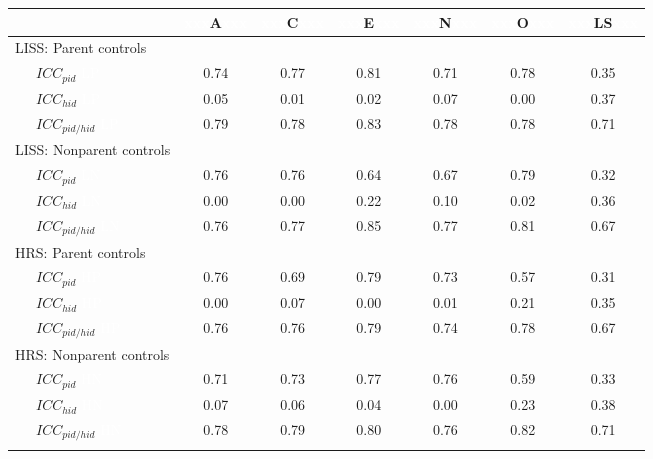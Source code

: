\begin{appendix}
\begin{table}[h]
\begin{center}
\begin{threeparttable}
\begin{tabular}{lcccccc}
\toprule
 & \multicolumn{1}{c}{\textcolor{white}{xxx}A\textcolor{white}{xxx}} & \multicolumn{1}{c}{\textcolor{white}{xxx}C\textcolor{white}{xxx}} & \multicolumn{1}{c}{\textcolor{white}{xxx}E\textcolor{white}{xxx}} & \multicolumn{1}{c}{\textcolor{white}{xxx}N\textcolor{white}{xxx}} & \multicolumn{1}{c}{\textcolor{white}{xxx}O\textcolor{white}{xxx}} & \multicolumn{1}{c}{\textcolor{white}{xxx}LS\textcolor{white}{xxx}}\\
\midrule
LISS: Parent controls &  &  &  &  &  & \\
\ \ \ $ICC_{pid}$ \textcolor{white}{LP} & 0.74 & 0.77 & 0.81 & 0.71 & 0.78 & 0.35\\
\ \ \ $ICC_{hid}$ \textcolor{white}{LP} & 0.05 & 0.01 & 0.02 & 0.07 & 0.00 & 0.37\\
\ \ \ $ICC_{pid/hid}$ \textcolor{white}{LP} & 0.79 & 0.78 & 0.83 & 0.78 & 0.78 & 0.71\\
LISS: Nonparent controls &  &  &  &  &  & \\
\ \ \ $ICC_{pid}$ \textcolor{white}{LN} & 0.76 & 0.76 & 0.64 & 0.67 & 0.79 & 0.32\\
\ \ \ $ICC_{hid}$ \textcolor{white}{LN} & 0.00 & 0.00 & 0.22 & 0.10 & 0.02 & 0.36\\
\ \ \ $ICC_{pid/hid}$ \textcolor{white}{LN} & 0.76 & 0.77 & 0.85 & 0.77 & 0.81 & 0.67\\
HRS: Parent controls &  &  &  &  &  & \\
\ \ \ $ICC_{pid}$ \textcolor{white}{HP} & 0.76 & 0.69 & 0.79 & 0.73 & 0.57 & 0.31\\
\ \ \ $ICC_{hid}$ \textcolor{white}{HP} & 0.00 & 0.07 & 0.00 & 0.01 & 0.21 & 0.35\\
\ \ \ $ICC_{pid/hid}$ \textcolor{white}{HP} & 0.76 & 0.76 & 0.79 & 0.74 & 0.78 & 0.67\\
HRS: Nonparent controls &  &  &  &  &  & \\
\ \ \ $ICC_{pid}$ \textcolor{white}{HN} & 0.71 & 0.73 & 0.77 & 0.76 & 0.59 & 0.33\\
\ \ \ $ICC_{hid}$ \textcolor{white}{HN} & 0.07 & 0.06 & 0.04 & 0.00 & 0.23 & 0.38\\
\ \ \ $ICC_{pid/hid}$ \textcolor{white}{HN} & 0.78 & 0.79 & 0.80 & 0.76 & 0.82 & 0.71\\
\bottomrule
\addlinespace
\end{tabular}


\end{threeparttable}
\end{center}
\end{table}
\end{appendix}

